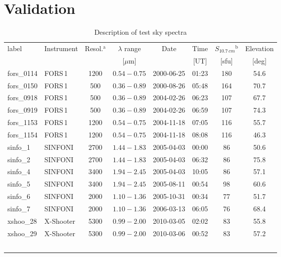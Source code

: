 \section{Validation}\label{sec:evaluation}
\begin{table}
\caption[]{Description of test sky spectra}
\label{tab:sample}
\centering
\vspace{5pt}
\begin{tabular}{l l c c c c c c}
\hline\hline
\noalign{\smallskip}
label & Instrument & Resol.$^\mathrm{a}$ & $\lambda$ range & Date & Time &
$S_{10.7\,cm}$$^\mathrm{b}$ & Elevation \\
& & & [$\mu$m] & & [UT] & [sfu] & [deg] \\
\noalign{\smallskip}
\hline
\noalign{\smallskip}
fors\_0114 & FORS\,1 & 1200 & $0.54 - 0.75$ & 2000-06-25 & 01:23 & 180 & 54.6\\
fors\_0150 & FORS\,1 & 500 & $0.36 - 0.89$ & 2000-08-26 & 05:48 & 164 & 70.7 \\
fors\_0918 & FORS\,1 & 500 & $0.36 - 0.89$ & 2004-02-26 & 06:23 & 107 & 67.7 \\
fors\_0919 & FORS\,1 & 500 & $0.36 - 0.89$ & 2004-02-26 & 06:59 & 107 & 74.3 \\
fors\_1153 & FORS\,1 & 1200 & $0.54 - 0.75$ & 2004-11-18 & 07:05 & 116 & 55.7\\
fors\_1154 & FORS\,1 & 1200 & $0.54 - 0.75$ & 2004-11-18 & 08:08 & 116 & 46.3\\
sinfo\_1 & SINFONI & 2700 & $1.44 - 1.83$ & 2005-04-03 & 00:00 & 86 & 50.6 \\
sinfo\_2 & SINFONI & 2700 & $1.44 - 1.83$ & 2005-04-03 & 06:32 & 86 & 75.8 \\
sinfo\_4 & SINFONI & 3400 & $1.94 - 2.45$ & 2005-04-03 & 10:05 & 86 & 57.1 \\
sinfo\_5 & SINFONI & 3400 & $1.94 - 2.45$ & 2005-08-11 & 00:54 & 98 & 60.6 \\
sinfo\_6 & SINFONI & 2000 & $1.10 - 1.36$ & 2005-10-31 & 00:34 & 77 & 51.7 \\
sinfo\_7 & SINFONI & 2000 & $1.10 - 1.36$ & 2006-03-13 & 06:05 & 76 & 68.4 \\
xshoo\_28 & X-Shooter & 5300 & $0.99 - 2.00$ & 2010-03-05 & 02:02 & 83 & 55.8\\
xshoo\_29 & X-Shooter & 5300 & $0.99 - 2.00$ & 2010-03-06 & 00:52 & 83 & 57.2\\
$$
\end{tabular}
\end{table}
